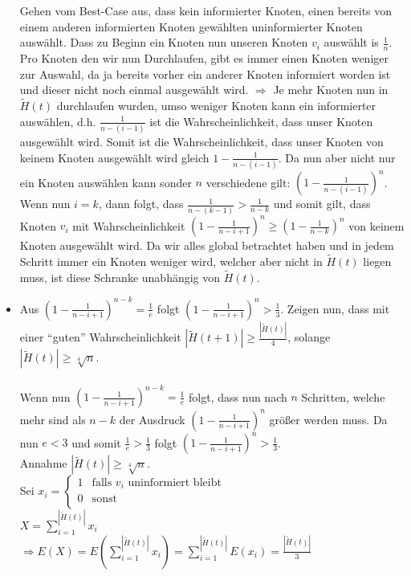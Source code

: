 \documentclass[12pt,a4paper]{report}
\begin{document}
\begin{itemize}
	Gehen vom Best-Case aus, dass kein informierter Knoten, einen bereits von einem anderen informierten Knoten gewählten uninformierter Knoten auswählt. Dass zu Beginn ein Knoten  nun unseren Knoten $v_i$ auswählt is $\frac{1}{n}$. Pro Knoten den wir nun Durchlaufen, gibt es immer einen Knoten weniger zur Auswahl, da ja bereits vorher ein anderer Knoten informiert worden ist und dieser nicht noch einmal ausgewählt wird.
	$\Rightarrow$ Je mehr Knoten nun in $\tilde{H}(t)$ durchlaufen wurden, umso weniger Knoten kann ein informierter auswählen, d.h. $\frac{1}{n-(i-1)}$ ist die Wahrscheinlichkeit, dass unser Knoten ausgewählt wird. Somit ist die Wahrscheinlichkeit, dass unser Knoten von keinem Knoten ausgewählt wird gleich $1-\frac{1}{n-(i-1)}$. Da nun aber nicht nur ein Knoten auswählen kann sonder $n$ verschiedene gilt:
	$(1-\frac{1}{n-(i-1)})^n$. Wenn nun $i=k$, dann folgt, dass $\frac{1}{n-(k-1)} > \frac{1}{n-k}$ und somit gilt, dass Knoten $v_i$ mit Wahrscheinlichkeit
	$(1-\frac{1}{n-i+1})^n \ge (1-\frac{1}{n-k})^n$	von keinem Knoten ausgewählt wird. Da wir alles global betrachtet haben und in jedem Schritt immer ein Knoten weniger wird, welcher aber nicht in  $\tilde{H}(t)$ liegen muss, ist diese Schranke unabhängig von  $\tilde{H}(t)$.\\
	\item Aus $(1-\frac{1}{n-i+1})^{n-k} = \frac{1}{e}$   folgt $(1-\frac{1}{n-i+1})^n > \frac{1}{3}$. Zeigen nun, dass mit einer \enquote{guten} Wahrscheinlichkeit $|\tilde{H}(t+1)| \ge \frac{|\tilde{H}(t)|}{4}$, solange $|\tilde{H}(t)| \ge \sqrt[4]{n}$.\\
	\\
	Wenn nun $(1-\frac{1}{n-i+1})^{n-k} = \frac{1}{e}$ folgt, dass nun nach $n$ Schritten, welche mehr sind als $n-k$ der Ausdruck $(1-\frac{1}{n-i+1})^{n}$ größer werden muss. Da nun $e<3$ und somit $\frac{1}{e}>\frac{1}{3}$ folgt $(1-\frac{1}{n-i+1})^n > \frac{1}{3}$.\\
	Annahme $|\tilde{H}(t)| \ge \sqrt[4]{n}$.\\
	Sei $x_i=\begin{cases}
	1 & \text{falls } v_i \text{ uninformiert bleibt}\\
	0 & \text{sonst}\\
	\end{cases}$\\
	$X = \sum_{i=1}^{|\tilde{H}(t)|}x_i$\\
	$\Rightarrow E(X) =E(\sum_{i=1}^{|\tilde{H}(t)|}x_i)= \sum_{i=1}^{|\tilde{H}(t)|}E(x_i)=\frac{|\tilde{H}(t)|}{3}$\\

\end{itemize}
\end{document}
